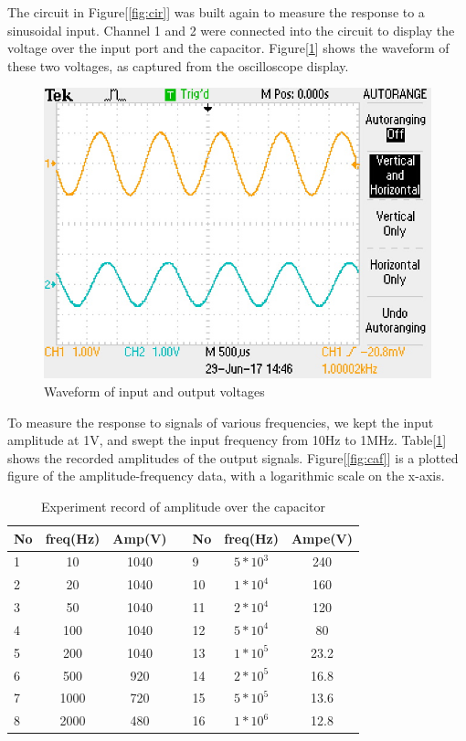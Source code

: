 \hfill\newline
\phantom{ } The circuit in Figure[\ref{fig:cir}] was built again to measure the response to a sinusoidal input. Channel 1 and 2 were connected into the circuit to display the voltage over the input port and the capacitor. Figure[\ref{fig:sinwave}] shows the waveform of these two voltages, as captured from the oscilloscope display. 

\begin{figure}[!htbp]
	\centering
	\includegraphics[width=\linewidth]{images/TEK0011.JPG}
	\caption{Waveform of input and output voltages}
	\label{fig:sinwave}
\end{figure}

\phantom{ } To measure the response to signals of various frequencies, we kept the input amplitude at 1V, and swept the input frequency from 10Hz to 1MHz. Table[\ref{tab:caf}] shows the recorded amplitudes of the output signals. Figure[\ref{fig:caf}] is a plotted figure of the amplitude-frequency data, with a logarithmic scale on the x-axis.

\begin{table}[!htbp]
	\centering
	\caption{Experiment record of amplitude over the capacitor}
	\begin{tabular}{lccllcc}
		\toprule
		No&freq(Hz)&Amp(V)&&No&freq(Hz)  &Ampe(V)\\
		\midrule
		1	&10		&1040	&&9 &$5*10^3$&240\\
		2	&20		&1040	&&10&$1*10^4$&160\\
		3	&50		&1040	&&11&$2*10^4$&120\\
		4	&100	&1040	&&12&$5*10^4$&80\\
		5	&200	&1040	&&13&$1*10^5$&23.2\\
		6	&500	&920	&&14&$2*10^5$&16.8\\
		7	&1000	&720	&&15&$5*10^5$&13.6\\
		8	&2000	&480	&&16&$1*10^6$&12.8\\
		\bottomrule
	\end{tabular}
	\label{tab:caf}
\end{table}


